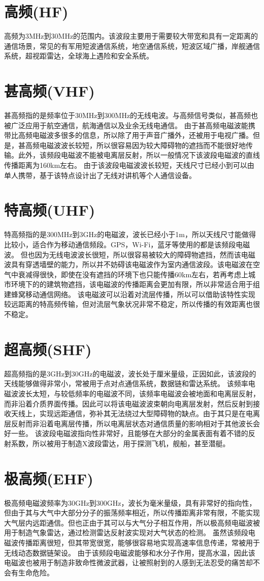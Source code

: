 \documentclass[UTF8]{article}
\begin{document}
\begin{CJK}{UTF8}{gkai}
\section{高频(HF)}
高频为3MHz到30MHz的范围内。该波段主要用于需要较大带宽和具有一定距离的通信场景，常见的有军用短波通信系统，地空通信系统，短波区域广播，岸舰通信系统，超视距雷达，全球海上遇险和安全系统。
\section{甚高频(VHF)}
甚高频指的是频率位于30MHz到300MHz的无线电波。与高频信号类似，甚高频也被广泛应用于航空通信，航海通信以及业余无线电通信。
由于甚高频电磁波能携带比高频电磁波多很多的信息，所以除了用于声音广播外，还被用于电视广播。但是，甚高频电磁波波长较短，所以很容易因为较大障碍物的遮挡而不能很好地传输。此外，该频段电磁波不能被电离层反射，所以一般情况下该波段电磁波的直线传播距离为160km左右。
由于该波段电磁波波长较短，天线尺寸已经小到可以由单人携带，基于该特点设计出了无线对讲机等个人通信设备。
\section{特高频(UHF)}
特高频指的是300MHz到3GHz的电磁波，波长已经小于1m，所以天线尺寸能做得比较小，适合作为移动通信频段。GPS，Wi-Fi，蓝牙等使用的都是该频段电磁波。
但也因为无线电波波长很短，所以很容易被较大的障碍物遮挡，然而该电磁波具有穿透墙壁的能力，所以并不妨碍该电磁波作为室内通信波段。该电磁波在空气中衰减得很快，即使在没有遮挡的环境下也只能传播60km左右，若再考虑上城市环境下的的建筑物遮挡，该电磁波的传播距离会更加有限，所以非常适合用于组建蜂窝移动通信网络。
该电磁波可以沿着对流层传播，所以可以借助该特性实现较远距离的特高频传输，但对流层气象状况非常不稳定，所以传播的有效距离也很不稳定。
\section{超高频(SHF)}
超高频指的是3GHz到30GHz的电磁波，波长处于厘米量级，正因如此，该波段的天线能够做得非常小，常被用于点对点通信系统，数据链和雷达系统。
该频率电磁波波长太短，与较低频率的电磁波不同，该频率电磁波会被地面和电离层反射，而非沿着介质界面传播。因此可以将该电磁波波束朝向电离层发射，然后反射到接收天线上，实现远距通信，弥补其无法绕过大型障碍物的缺点。由于其只是在电离层反射而非沿着电离层传播，所以电离层状态对通信质量的影响相对于其他波长会好一些。
该波段电磁波指向性非常好，且能够在大部分的金属表面有着不错的反射系数，所以被用于制造X波段雷达，用于探测飞机，舰船，甚至潜艇。
\section{极高频(EHF)}
极高频电磁波频率为30GHz到300GHz，波长为毫米量级，具有非常好的指向性，但由于其与大气中大部分分子的振荡频率相近，所以传播距离非常有限，不能实现大气层内远距通信。但也正由于其可以与大气分子相互作用，所以极高频电磁波被用于制造气象雷达，通过检测雷达反射波实现对大气状态的检测。
虽然该频段电磁波传播距离很短，但其带宽很宽，能够很容易地实现高速率信息传递，常被用于无线动态数据链架设。
由于该频段电磁波能够和水分子作用，提高水温，因此该电磁波也被用于制造非致命性微波武器，让被照射到的人感到无法忍受的痛苦却不会有生命危险。

\end{CJK}
\end{document}
